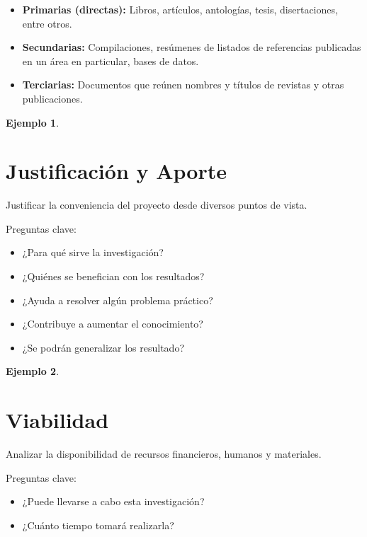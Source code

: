 \documentclass[letter,12pt]{report}
\newcommand\naranjo[1]{\textcolor[rgb]{1.00,0.36,0.06}{\textbf{#1}}}
\newtheorem{ejemplo}{Ejemplo}
\begin{document}
\begin{itemize}\justifying
  \item \naranjo{Primarias (directas):} Libros, artículos, antologías, tesis, disertaciones, entre otros.
  \item \naranjo{Secundarias:} Compilaciones, resúmenes de listados de referencias publicadas en un área en particular, bases de datos.
  \item \naranjo{Terciarias:} Documentos que reúnen nombres y títulos de revistas y otras publicaciones.
\end{itemize}


\begin{ejemplo}
\blindtext %
\end{ejemplo} 

\section{Justificación y Aporte}
Justificar la conveniencia del proyecto desde diversos puntos de vista.

Preguntas clave:
  \begin{itemize}
  \item ¿Para qué sirve la investigación?
  \item ¿Quiénes se benefician con los resultados?
  \item ¿Ayuda a resolver algún problema práctico?
  \item ¿Contribuye a aumentar el conocimiento?
  \item ¿Se podrán generalizar los resultado?
\end{itemize}


\begin{ejemplo}
\blindtext %
\end{ejemplo}


\section{Viabilidad}
Analizar la disponibilidad de recursos financieros, humanos y materiales.

Preguntas clave:
  \begin{itemize}\justifying
  \item ¿Puede llevarse a cabo esta investigación?
  \item ¿Cuánto tiempo tomará realizarla?
\end{itemize}
\end{document}
